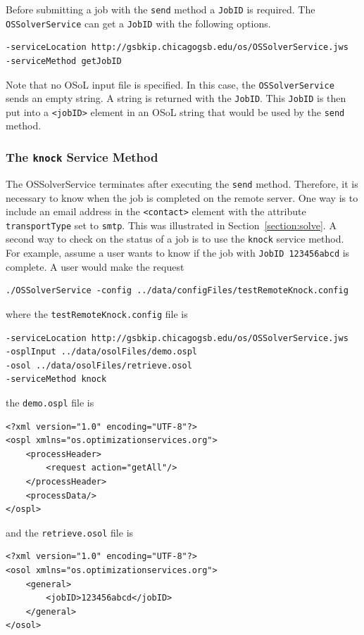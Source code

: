 \documentclass[11pt]{article}
\renewcommand{\_}{{\char"5F}}
\renewcommand{\{}{{\char"7B}}
\renewcommand{\}}{{\char"7D}}
\renewcommand{\^}{{\char"0D}}
\renewcommand{\'}{{\char"0D}}
\begin{document}
\begin{enumerate}[Step 1:]
Before  submitting a job with the {\tt send} method a {\tt JobID}
is required. The {\tt OSSolverService} can get a {\tt JobID} with the following options.
\begin{verbatim}
-serviceLocation http://gsbkip.chicagogsb.edu/os/OSSolverService.jws
-serviceMethod getJobID
\end{verbatim}
Note that no OSoL input file is specified. In this case, the {\tt OSSolverService} sends an empty string.
A string is returned with the {\tt JobID}. This {\tt JobID} is then put into a {\tt <jobID>} element in an
OSoL string that would be used by the {\tt send} method.


\subsubsection{The  {\tt knock} Service Method}\label{section:knock}

The OSSolverService terminates after executing the {\tt send} method. Therefore,
it is necessary to know when the job is completed on the remote server. One way is to include an email
address in the  {\tt <contact>}  element with the attribute {\tt transportType} set to {\tt smtp}.
This was illustrated in Section~\ref{section:solve}.  A second way to check on the status of a job is
to use the {\tt knock} service method.  For example, assume a user   wants to know if  the job
with {\tt JobID 123456abcd}  is complete. A user would make the request
\begin{verbatim}
./OSSolverService -config ../data/configFiles/testRemoteKnock.config
\end{verbatim}
where the {\tt testRemoteKnock.config} file is
\begin{verbatim}
-serviceLocation http://gsbkip.chicagogsb.edu/os/OSSolverService.jws
-osplInput ../data/osolFiles/demo.ospl
-osol ../data/osolFiles/retrieve.osol
-serviceMethod knock
\end{verbatim}
the {\tt demo.ospl} file is
\begin{verbatim}
<?xml version="1.0" encoding="UTF-8"?>
<ospl xmlns="os.optimizationservices.org">
    <processHeader>
        <request action="getAll"/>
    </processHeader>
    <processData/>
</ospl>
\end{verbatim}
and the {\tt retrieve.osol} file is
\begin{verbatim}
<?xml version="1.0" encoding="UTF-8"?>
<osol xmlns="os.optimizationservices.org">
    <general>
        <jobID>123456abcd</jobID>
    </general>
</osol>
\end{verbatim}


\end{enumerate}
\end{document}
